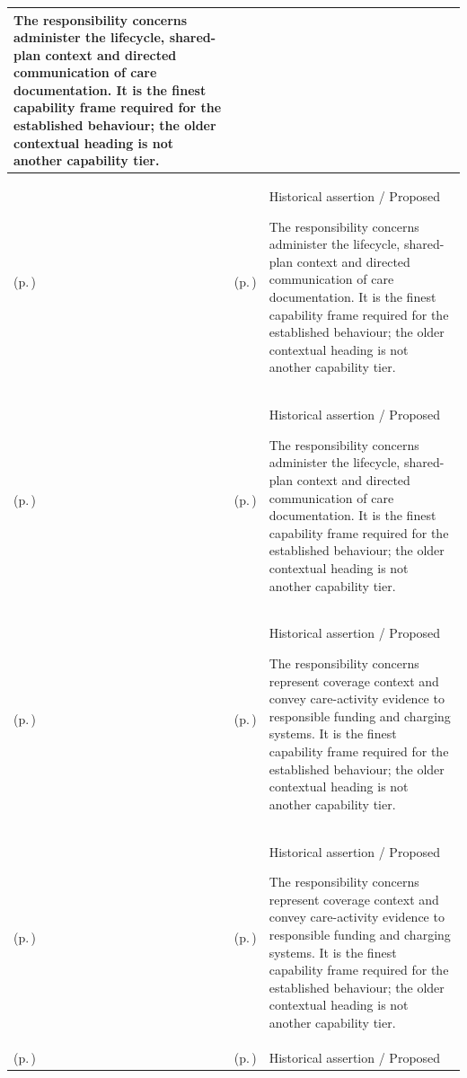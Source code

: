 \begin{longtable}{|>{\raggedright\arraybackslash}p{0.27\TableWidth}|>{\raggedright\arraybackslash}p{0.27\TableWidth}|>{\raggedright\arraybackslash}p{0.46\TableWidth}|}
The responsibility concerns administer the lifecycle, shared-plan context and directed communication of care documentation. It is the finest capability frame required for the established behaviour; the older contextual heading is not another capability tier.\\\hline
\nameref{cap:bec-care-documentation-communication-enablement} (p.\,\pageref{cap:bec-care-documentation-communication-enablement}) & \nameref{cap:bec-care-plan-administration} (p.\,\pageref{cap:bec-care-plan-administration}) & Historical assertion / Proposed

The responsibility concerns administer the lifecycle, shared-plan context and directed communication of care documentation. It is the finest capability frame required for the established behaviour; the older contextual heading is not another capability tier.\\\hline
\nameref{cap:bec-care-documentation-communication-enablement} (p.\,\pageref{cap:bec-care-documentation-communication-enablement}) & \nameref{cap:bec-clinical-communication-administration} (p.\,\pageref{cap:bec-clinical-communication-administration}) & Historical assertion / Proposed

The responsibility concerns administer the lifecycle, shared-plan context and directed communication of care documentation. It is the finest capability frame required for the established behaviour; the older contextual heading is not another capability tier.\\\hline
\nameref{cap:bec-care-financial-information-enablement} (p.\,\pageref{cap:bec-care-financial-information-enablement}) & \nameref{cap:bec-funding-coverage-administration} (p.\,\pageref{cap:bec-funding-coverage-administration}) & Historical assertion / Proposed

The responsibility concerns represent coverage context and convey care-activity evidence to responsible funding and charging systems. It is the finest capability frame required for the established behaviour; the older contextual heading is not another capability tier.\\\hline
\nameref{cap:bec-care-financial-information-enablement} (p.\,\pageref{cap:bec-care-financial-information-enablement}) & \nameref{cap:bec-clinical-charging-claims-administration} (p.\,\pageref{cap:bec-clinical-charging-claims-administration}) & Historical assertion / Proposed

The responsibility concerns represent coverage context and convey care-activity evidence to responsible funding and charging systems. It is the finest capability frame required for the established behaviour; the older contextual heading is not another capability tier.\\\hline
\nameref{cap:bec-specialist-clinical-context-integration} (p.\,\pageref{cap:bec-specialist-clinical-context-integration}) & \nameref{cap:bec-clinical-assessment} (p.\,\pageref{cap:bec-clinical-assessment}) & Historical assertion / Proposed


\end{longtable}
